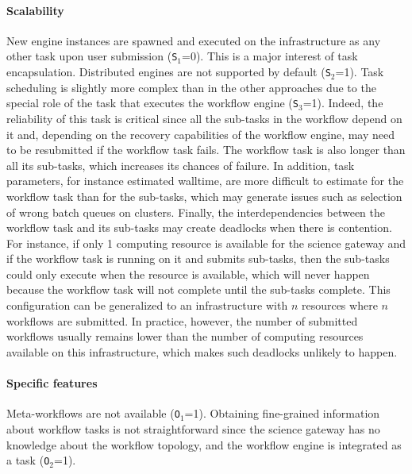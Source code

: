 \documentclass[preprint,3p,twocolumn]{elsarticle}
\newcommand{\todo}[2]{\pdfmargincomment[color=red,author=#1,open=true]{#2}}
\begin{document}

\paragraph{Scalability}
New engine instances are spawned and executed on the infrastructure as
any other task upon user submission (\texttt{S$_1$}=0). This is a
major interest of task encapsulation. Distributed engines are
not supported by default (\texttt{S$_2$}=1). Task scheduling is
slightly more complex than in the other approaches due to the special
role of the task that executes the workflow engine
(\texttt{S$_3$}=1). Indeed, the reliability of this task is critical
since all the sub-tasks in the workflow depend on it and, depending on
the recovery capabilities of the workflow engine, may need to be
resubmitted if the workflow task fails. The workflow task is also
longer than all its sub-tasks, which increases its chances of
failure. In addition, task parameters, for instance estimated
walltime, are more difficult to estimate for the workflow task than
for the sub-tasks, which may generate issues such as selection of wrong
batch queues on clusters. Finally, the interdependencies between the
workflow task and its sub-tasks may create deadlocks when there is
contention. For instance, if only 1 computing resource is
available for the science gateway and if the workflow task is
running on it and submits sub-tasks, then the sub-tasks could only
execute when the resource is available, which will never happen
because the workflow task will not complete until the sub-tasks
complete. This configuration can be generalized to an infrastructure
with $n$ resources where $n$ workflows are submitted. In practice,
however, the number of submitted workflows usually remains lower than
the number of computing resources available on this infrastructure,
which makes such deadlocks unlikely to happen.

\paragraph{Specific features} Meta-workflows are not available
(\texttt{O$_1$}=1).  Obtaining fine-grained information about workflow
tasks is not straightforward since the science gateway has no
knowledge about the workflow topology, and the workflow engine is
integrated as a task (\texttt{O$_2$}=1).
\end{document}
